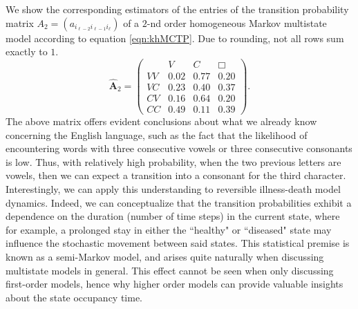 \documentclass[11pt, a4paper]{article}
\numberwithin{equation}{section}
\theoremstyle{plain}
\theoremstyle{definition}
\begin{document}
We show the corresponding estimators of the entries of the transition probability matrix $A_2 = (a_{i_{\ell-2} i_{\ell-1} i_\ell})$ of a $2$-nd order homogeneous Markov multistate model according to equation \eqref{eqn:khMCTP}. Due to rounding, not all rows sum exactly to $1$. 
\[ {\boldsymbol{  \widehat A}_2}
=
\left(
\begin{array}{c|ccc}
      & V & C & \mathcal\Box \\
\hline
VV & 0.02 & 0.77 & 0.20 \\
VC & 0.23 & 0.40 & 0.37 \\
CV & 0.16 & 0.64 & 0.20 \\
CC & 0.49 & 0.11 & 0.39
\end{array}
\right).
\]
The above matrix offers evident conclusions about what we already know concerning the English language, such as the fact that the likelihood of encountering words with three consecutive vowels or three consecutive consonants is low. Thus, with relatively high probability, when the two previous letters are vowels, then we can expect a transition into a consonant for the third character. Interestingly, we can apply this understanding to reversible illness-death model dynamics. Indeed, we can conceptualize that the transition probabilities exhibit a dependence on the duration (number of time steps) in the current state, where for example, a prolonged stay in either the ``healthy" or ``diseased" state may influence the stochastic movement between said states. This statistical premise is known as a semi-Markov model, and arises quite naturally when discussing multistate models in general. This effect cannot be seen when only discussing first-order models, hence why higher order models can provide valuable insights about the state occupancy time. 
\end{document}

